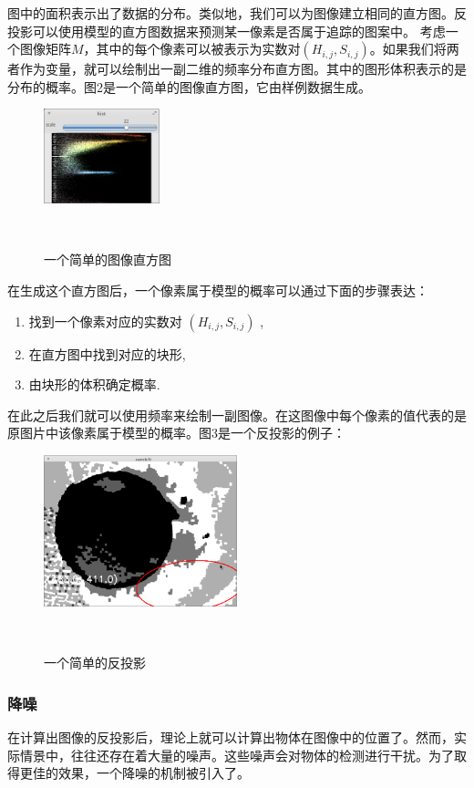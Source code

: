 图中的面积表示出了数据的分布。类似地，我们可以为图像建立相同的直方图。反投影可以使用模型的直方图数据来预测某一像素是否属于追踪的图案中。
考虑一个图像矩阵$M$，其中的每个像素可以被表示为实数对$(H_{i,j},S_{i,j})$。如果我们将两者作为变量，就可以绘制出一副二维的频率分布直方图。其中的图形体积表示的是分布的概率。图2是一个简单的图像直方图，它由样例数据生成。\\
\begin{figure}[h]

  \centering
    \includegraphics[width=0.3\textwidth]{../Pictures/2dhist.png}
    \caption{一个简单的图像直方图}\\
\end{figure}
在生成这个直方图后，一个像素属于模型的概率可以通过下面的步骤表达：
\begin{enumerate}
  \item 找到一个像素对应的实数对 $(H_{i,j},S_{i,j})$ ,
  \item 在直方图中找到对应的块形,
  \item 由块形的体积确定概率.
\end{enumerate}
在此之后我们就可以使用频率来绘制一副图像。在这图像中每个像素的值代表的是原图片中该像素属于模型的概率。图3是一个反投影的例子：\\
\begin{figure}[h]

  \centering
    \includegraphics[width=0.5\textwidth]{../Pictures/backproject.png}
    \caption{一个简单的反投影}\\
\end{figure}
\subsubsection{降噪}
在计算出图像的反投影后，理论上就可以计算出物体在图像中的位置了。然而，实际情景中，往往还存在着大量的噪声。这些噪声会对物体的检测进行干扰。为了取得更佳的效果，一个降噪的机制被引入了。

